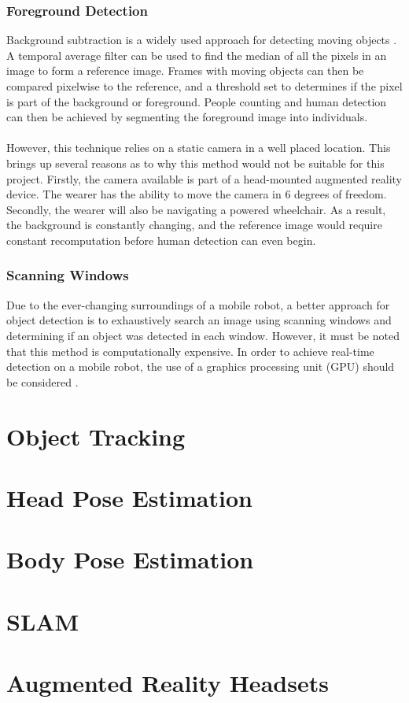 \subsubsection{Foreground Detection}
Background subtraction is a widely used approach for detecting moving objects \cite{Piccardi2004}. A temporal average filter can be used to find the median of all the pixels in an image to form a reference image. Frames with moving objects can then be compared pixelwise to the reference, and a threshold set to determines if the pixel is part of the background or foreground. People counting and human detection can then be achieved by segmenting the foreground image into individuals.

\paragraph{} However, this technique relies on a static camera in a well placed location. This brings up several reasons as to why this method would not be suitable for this project. Firstly, the camera available is part of a head-mounted augmented reality device. The wearer has the ability to move the camera in 6 degrees of freedom. Secondly, the wearer will also be navigating a powered wheelchair. As a result, the background is constantly changing, and the reference image would require constant recomputation before human detection can even begin.

\subsubsection{Scanning Windows}
Due to the ever-changing surroundings of a mobile robot, a better approach for object detection is to exhaustively search an image using scanning windows and determining if an object was detected in each window. However, it must be noted that this method is computationally expensive. In order to achieve real-time detection on a mobile robot, the use of a graphics processing unit (GPU) should be considered \cite{Hirabayashi}.




\section{Object Tracking}

\section{Head Pose Estimation}

\section{Body Pose Estimation}

\section{SLAM}

\section{Augmented Reality Headsets}